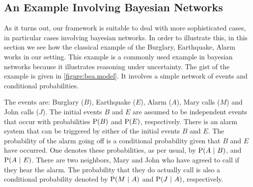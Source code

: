 \documentclass[a4paper]{article}
\renewcommand{\cite}{\citep}
\newcommand{\at}[1]{\ensuremath{\!\del{#1}}}        %
\newcommand{\prfunc}{\ensuremath{\mathrm{P}}}
\newcommand{\pr}[1]{\ensuremath{\prfunc\at{#1}}}
\newcommand{\given}{\ensuremath{~\middle|~}}
\begin{document}
\subsection{An Example Involving Bayesian Networks}\label{subsec:example.bayesian.networks}
%
%
%
As it turns out, our framework is suitable to deal with more
sophisticated cases, in particular cases involving bayesian networks.
In order to illustrate this, in this section we see how the classical
example of the Burglary, Earthquake, Alarm \cite{judea88probabilistic} works in our
setting.  This example is a commonly used example in bayesian networks
because it illustrates reasoning under uncertainty.  The gist of the
example is given in \cref{figure:bea.model}.  It involves a simple network
of events and conditional probabilities.

The events are: Burglary (\(B\)), Earthquake (\(E\)), Alarm (\(A\)),
Mary calls (\(M\)) and John calls (\(J\)).  The initial events \(B\)
and \(E\) are assumed to be independent events that occur with
probabilities \(\pr{B}\) and \(\pr{E}\), respectively.  There is an
alarm system that can be triggered by either of the initial events
\(B\) and \(E\).  The probability of the alarm going off is a
conditional probability given that \(B\) and \(E\) have occurred.  One
denotes these probabilities, as per usual, by \(\pr{A \given B}\), and
\(\pr{A \given E}\).  There are two neighbors, Mary and John who have
agreed to call if they hear the alarm.  The probability that they do
actually call is also a conditional probability denoted by
\(\pr{M \given A}\) and \(\pr{J \given A}\), respectively.
\end{document}
